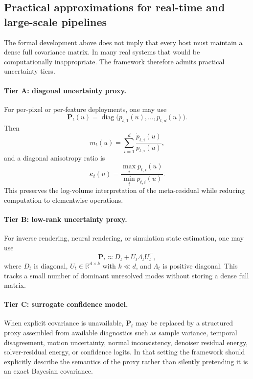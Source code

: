 \documentclass[11pt,letterpaper]{article}
\newcommand{\R}{\mathbb{R}}
\newcommand{\covar}{\mathbf{P}}
\newcommand{\metares}{m}
\newcommand{\diag}{\operatorname{diag}}
\theoremstyle{gcresult}
\theoremstyle{definition}
\begin{document}
\subsection{Practical approximations for real-time and large-scale pipelines}
The formal development above does not imply that every host must maintain a dense full covariance matrix. In many real systems that would be computationally inappropriate. The framework therefore admits practical uncertainty tiers.

\paragraph{Tier A: diagonal uncertainty proxy.}
For per-pixel or per-feature deployments, one may use
\begin{equation}
    \covar_t(u) = \diag\big(p_{t,1}(u),\dots,p_{t,d}(u)\big).
\end{equation}
Then
\begin{equation}
    \metares_t(u) = \sum_{i=1}^{d} \frac{\dot p_{t,i}(u)}{p_{t,i}(u)},
\end{equation}
and a diagonal anisotropy ratio is
\begin{equation}
    \kappa_t(u) = \frac{\max_i p_{t,i}(u)}{\min_i p_{t,i}(u)}.
\end{equation}
This preserves the log-volume interpretation of the meta-residual while reducing computation to elementwise operations.

\paragraph{Tier B: low-rank uncertainty proxy.}
For inverse rendering, neural rendering, or simulation state estimation, one may use
\begin{equation}
    \covar_t \approx D_t + U_t \Lambda_t U_t^\top,
\end{equation}
where $D_t$ is diagonal, $U_t \in \R^{d\times k}$ with $k \ll d$, and $\Lambda_t$ is positive diagonal. This tracks a small number of dominant unresolved modes without storing a dense full matrix.

\paragraph{Tier C: surrogate confidence model.}
When explicit covariance is unavailable, $\covar_t$ may be replaced by a structured proxy assembled from available diagnostics such as sample variance, temporal disagreement, motion uncertainty, normal inconsistency, denoiser residual energy, solver-residual energy, or confidence logits. In that setting the framework should explicitly describe the semantics of the proxy rather than silently pretending it is an exact Bayesian covariance.
\end{document}
